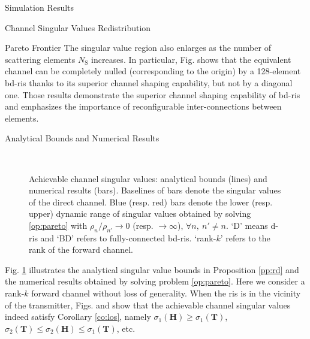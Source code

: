 \documentclass[journal]{IEEEtran}
\begin{document}
\begin{section}{Simulation Results}
\begin{subsection}{Channel Singular Values Redistribution}
\begin{subsubsection}{Pareto Frontier}
		 The singular value region also enlarges as the number of scattering elements $N_\mathrm{S}$ increases.
		 In particular, Fig.  shows that the equivalent channel can be completely nulled (corresponding to the origin) by a 128-element \gls{bd}-\gls{ris} thanks to its superior channel shaping capability, but not by a diagonal one.
		 Those results demonstrate the superior channel shaping capability of \gls{bd}-\gls{ris} and emphasizes the importance of reconfigurable inter-connections between elements.
	 \end{subsubsection}

	 \begin{subsubsection}{Analytical Bounds and Numerical Results}
		 \begin{figure}[!t]
			 \centering
			 \\
			 \caption{
				 Achievable channel singular values: analytical bounds (lines) and numerical results (bars).
				 Baselines of bars denote the singular values of the direct channel.
				 Blue (resp. red) bars denote the lower (resp. upper) dynamic range of singular values obtained by solving \eqref{op:pareto} with $\rho_n/\rho_{n'} \to 0$ (resp. $\to \infty$), $\forall n, \ n' \ne n$.
				 `D' means \gls{d}-\gls{ris} and `BD' refers to fully-connected \gls{bd}-\gls{ris}.
				 `rank-$k$' refers to the rank of the forward channel.
			 }
			 \label{fg:singular_bound}
		 \end{figure}
		 Fig. \ref{fg:singular_bound} illustrates the analytical singular value bounds in Proposition \ref{pp:rd} and the numerical results obtained by solving problem \eqref{op:pareto}.
		 Here we consider a rank-$k$ forward channel without loss of generality.
		 When the \gls{ris} is in the vicinity of the transmitter, Figs.  and  show that the achievable channel singular values indeed satisfy Corollary \ref{co:los}, namely $\sigma_1(\mathbf{H}) \ge \sigma_1(\mathbf{T})$, $\sigma_2(\mathbf{T}) \le \sigma_2(\mathbf{H}) \le \sigma_1(\mathbf{T})$, etc.

\end{subsubsection}
\end{subsection}
\end{section}
\end{document}
